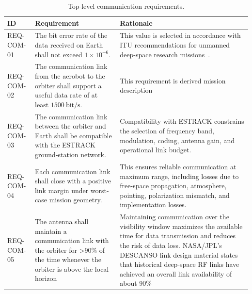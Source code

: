 \begin{table}[H]
    \centering
    \small
    \caption{Top-level communication requirements.}
    \label{tab:communication_requirements}
    \begin{tabular}{p{} p{} p{}}
        \hline
        \textbf{ID} & \textbf{Requirement} & \textbf{Rationale} \\
        \hline
        REQ-COM-01 & 
        The bit error rate of the data received on Earth shall not exceed 
        $1 \times 10^{-6}$. & 
        This value is selected in accordance with ITU recommendations for 
        unmanned deep-space research missions~\cite{ITU-R-SA1014-4-2023}. \\
        \hline
        REQ-COM-02 & 
        The communication link from the aerobot to the orbiter shall support a useful data rate of at least $1500~\mathrm{bit/s}$. & 
        This requirement is derived mission description \\
        \hline
        REQ-COM-03 & 
        The communication link between the orbiter and Earth shall be compatible with the ESTRACK ground-station network. & 
        Compatibility with ESTRACK constrains the selection of frequency band, modulation, coding, antenna gain, and operational link budget. \\
        \hline
        REQ-COM-04 &
        Each communication link shall close with a positive link margin under worst-case mission geometry. &
        This ensures reliable communication at maximum range, including losses due to free-space propagation, atmosphere, pointing, polarization mismatch, and implementation losses. \\
        \hline
        REQ-COM-05 & The antenna shall maintain a communication link with the orbiter for >90\% of the time whenever the orbiter is above the local horizon & Maintaining communication over the visibility window maximizes the available time for data transmission and reduces the risk of data loss. NASA/JPL’s DESCANSO link design material states that historical deep-space RF links have achieved an overall link availability of about 90\%  \cite{chen2006linkSystemDesign} \\
        \hline
    \end{tabular}
\end{table}


